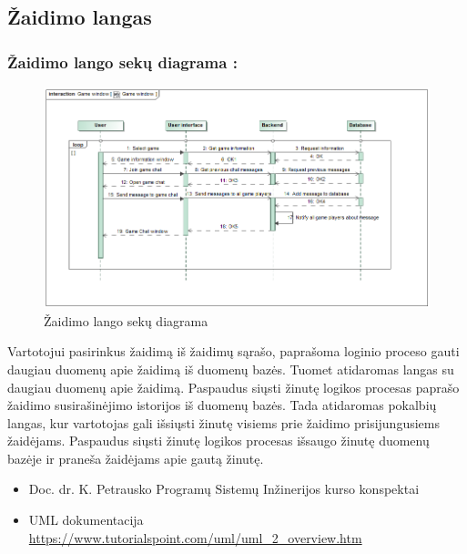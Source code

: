\documentclass{VUMIFPSkursinis}
\begin{document}
	\subsection{Žaidimo langas}		
		\subsubsection*{Žaidimo lango sekų diagrama :}
			\begin{figure}[H]
				\centering
				\includegraphics[scale=0.5]{img/GameWindow_sequence}
				\caption{Žaidimo lango sekų diagrama}
				\label{img:GameWindow_sequence}
			\end{figure}
			Vartotojui pasirinkus žaidimą iš žaidimų sąrašo, paprašoma loginio proceso
			gauti daugiau duomenų apie žaidimą iš duomenų bazės. Tuomet atidaromas 
			langas su daugiau duomenų apie žaidimą. Paspaudus siųsti žinutę logikos 
			procesas paprašo žaidimo susirašinėjimo istorijos iš duomenų bazės. Tada
			atidaromas pokalbių langas, kur vartotojas gali išsiųsti žinutę visiems 
			prie žaidimo prisijungusiems žaidėjams. Paspaudus siųsti žinutę logikos 
			procesas išsaugo žinutę duomenų bazėje ir praneša žaidėjams apie gautą žinutę.
	
\begin{itemize}
	\item Doc. dr. K. Petrausko Programų Sistemų Inžinerijos kurso konspektai
	\item UML dokumentacija \url{https://www.tutorialspoint.com/uml/uml_2_overview.htm}
\end{itemize}
		
\end{document}
